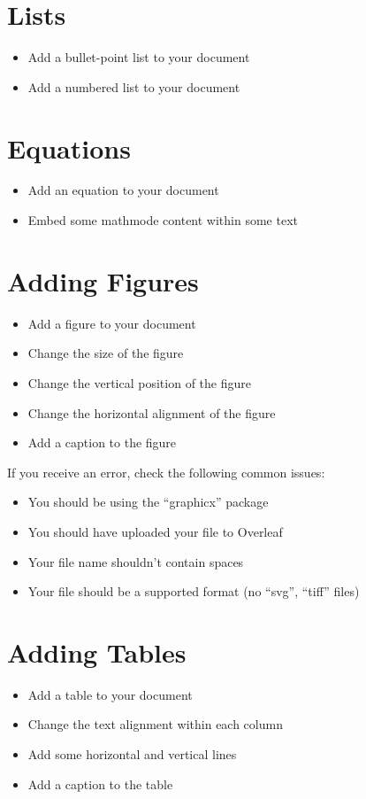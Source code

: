 \documentclass[11pt,a4paper]{article}
\begin{document}
\section{Lists}
\begin{itemize}
\item Add a bullet-point list to your document
\item Add a numbered list to your document
\end{itemize}

\section{Equations}
\begin{itemize}
\item Add an equation to your document
\item Embed some mathmode content within some text
\end{itemize}

\section{Adding Figures}
\begin{itemize}
\item Add a figure to your document
\item Change the size of the figure
\item Change the vertical position of the figure
\item Change the horizontal alignment of the figure
\item Add a caption to the figure
\end{itemize}

If you receive an error, check the following common issues:

\begin{itemize}
\item You should be using the ``graphicx'' package
\item You should have uploaded your file to Overleaf
\item Your file name shouldn't contain spaces
\item Your file should be a supported format (no ``svg'', ``tiff'' files)
\end{itemize}

\section{Adding Tables}
\begin{itemize}
\item Add a table to your document
\item Change the text alignment within each column
\item Add some horizontal and vertical lines
\item Add a caption to the table
\end{itemize}
\end{document}
